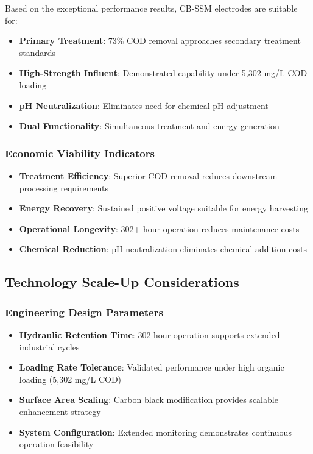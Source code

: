 \documentclass[12pt,a4paper]{article}
\begin{document}
Based on the exceptional performance results, CB-SSM electrodes are suitable for:

\begin{itemize}
    \item \textbf{Primary Treatment}: 73\% COD removal approaches secondary treatment standards
    \item \textbf{High-Strength Influent}: Demonstrated capability under 5,302 mg/L COD loading
    \item \textbf{pH Neutralization}: Eliminates need for chemical pH adjustment
    \item \textbf{Dual Functionality}: Simultaneous treatment and energy generation
\end{itemize}

\subsubsection{Economic Viability Indicators}

\begin{itemize}
    \item \textbf{Treatment Efficiency}: Superior COD removal reduces downstream processing requirements
    \item \textbf{Energy Recovery}: Sustained positive voltage suitable for energy harvesting
    \item \textbf{Operational Longevity}: 302+ hour operation reduces maintenance costs
    \item \textbf{Chemical Reduction}: pH neutralization eliminates chemical addition costs
\end{itemize}

\subsection{Technology Scale-Up Considerations}

\subsubsection{Engineering Design Parameters}

\begin{itemize}
    \item \textbf{Hydraulic Retention Time}: 302-hour operation supports extended industrial cycles
    \item \textbf{Loading Rate Tolerance}: Validated performance under high organic loading (5,302 mg/L COD)
    \item \textbf{Surface Area Scaling}: Carbon black modification provides scalable enhancement strategy
    \item \textbf{System Configuration}: Extended monitoring demonstrates continuous operation feasibility
\end{itemize}
\end{document}
